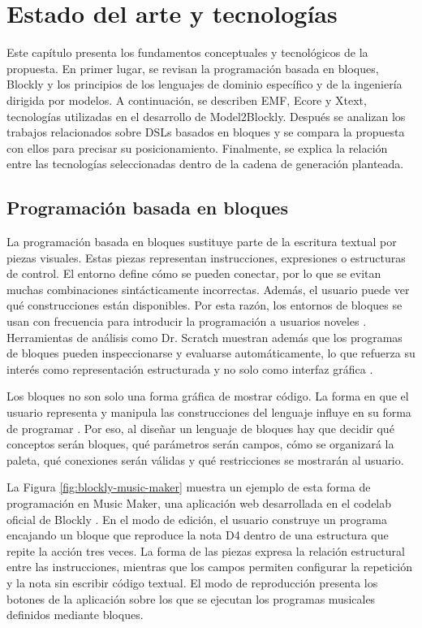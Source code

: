 \chapter{Estado del arte y tecnologías}
\label{chap:estado-arte}

Este capítulo presenta los fundamentos conceptuales y tecnológicos de la
propuesta. En primer lugar, se revisan la programación basada en bloques,
Blockly y los principios de los lenguajes de dominio específico y de la
ingeniería dirigida por modelos. A continuación, se describen EMF, Ecore y
Xtext, tecnologías utilizadas en el desarrollo de Model2Blockly. Después se
analizan los trabajos relacionados sobre DSLs basados en bloques y se compara
la propuesta con ellos para precisar su posicionamiento. Finalmente, se explica
la relación entre las tecnologías seleccionadas dentro de la cadena de
generación planteada.

\section{Programación basada en bloques}
\label{sec:block-based}

La programación basada en bloques sustituye parte de la escritura textual por
piezas visuales. Estas piezas representan instrucciones, expresiones o
estructuras de control. El entorno define cómo se pueden conectar, por lo que se
evitan muchas combinaciones sintácticamente incorrectas. Además, el usuario puede
ver qué construcciones están disponibles. Por esta razón, los entornos de bloques
se usan con frecuencia para introducir la programación a usuarios noveles
\cite{resnick2009scratch,lin2021landscape}. Herramientas de análisis como
Dr. Scratch muestran además que los programas de bloques pueden inspeccionarse
y evaluarse automáticamente, lo que refuerza su interés como representación
estructurada y no solo como interfaz gráfica \cite{moreno2015drscratch}.

Los bloques no son solo una forma gráfica de mostrar código. La forma en que el
usuario representa y manipula las construcciones del lenguaje influye en su forma
de programar \cite{weintrop2018modalities}. Por eso, al diseñar un lenguaje de
bloques hay que decidir qué conceptos serán bloques, qué parámetros serán campos,
cómo se organizará la paleta, qué conexiones serán válidas y qué restricciones se
mostrarán al usuario.

La Figura \ref{fig:blockly-music-maker} muestra un ejemplo de esta forma de
programación en Music Maker, una aplicación web desarrollada en el codelab
oficial de Blockly \cite{blocklyGettingStartedCodelab}. En el modo de edición,
el usuario construye un programa encajando un bloque que reproduce la nota D4
dentro de una estructura que repite la acción tres veces. La forma de las piezas
expresa la relación estructural entre las instrucciones, mientras que los campos
permiten configurar la repetición y la nota sin escribir código textual. El modo
de reproducción presenta los botones de la aplicación sobre los que se ejecutan
los programas musicales definidos mediante bloques.

